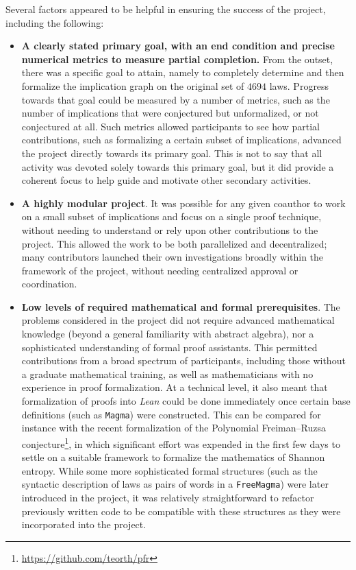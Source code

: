 Several factors appeared to be helpful in ensuring the success of the project, including the following:
\begin{itemize}
\item \textbf{A clearly stated primary goal, with an end condition and precise numerical metrics to measure partial completion.}  From the outset, there was a specific goal to attain, namely to completely determine and then formalize the implication graph on the original set of $4694$ laws.  Progress towards that goal could be measured by a number of metrics, such as the number of implications that were conjectured but unformalized, or not conjectured at all.   Such metrics allowed participants to see how partial contributions, such as formalizing a certain subset of implications, advanced the project directly towards its primary goal.  This is not to say that all activity was devoted solely towards this primary goal, but it did provide a coherent focus to help guide and motivate other secondary activities.
\item \textbf{A highly modular project}.  It was possible for any given coauthor to work on a small subset of implications and focus on a single proof technique, without needing to understand or rely upon other contributions to the project.  This allowed the work to be both parallelized and decentralized; many contributors launched their own investigations broadly within the framework of the project, without needing centralized approval or coordination.
\item \textbf{Low levels of required mathematical and formal prerequisites}.  The problems considered in the project did not require advanced mathematical knowledge (beyond a general familiarity with abstract algebra), nor a sophisticated understanding of formal proof assistants.  This permitted contributions from a broad spectrum of participants, including those without a graduate mathematical training, as well as mathematicians with no experience in proof formalization.  At a technical level, it also meant that formalization of proofs into \emph{Lean} could be done immediately once certain base definitions (such as \texttt{Magma}) were constructed.  This can be compared for instance with the recent formalization of the Polynomial Freiman--Ruzsa conjecture\footnote{\url{https://github.com/teorth/pfr}}, in which significant effort was expended in the first few days to settle on a suitable framework to formalize the mathematics of Shannon entropy.  While some more sophisticated formal structures (such as the syntactic description of laws as pairs of words in a \texttt{FreeMagma}) were later introduced in the project, it was relatively straightforward to refactor previously written code to be compatible with these structures as they were incorporated into the project.

\end{itemize}
